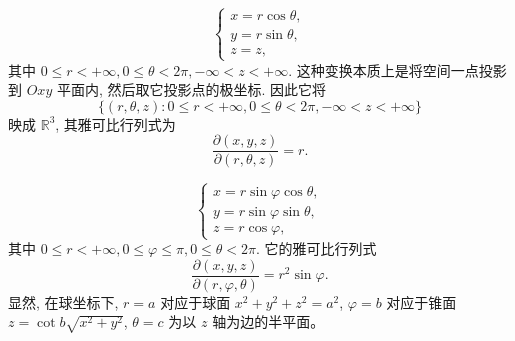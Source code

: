 \documentclass[12pt,fontset=fandol]{ctexart}
\begin{document}
\noindent{}
\[
  \begin{cases}
    x=r\cos\theta,\\
    y=r\sin\theta,\\
    z=z,
  \end{cases}
\]
其中 $0\leqslant r<+\infty,0\leqslant\theta<2\pi,-\infty<z<+\infty$. 这种变换本质上是将空间一点投影到 $Oxy$ 平面内, 然后取它投影点的极坐标. 因此它将
\[
  \{(r,\theta,z):0\leqslant r<+\infty,0\leqslant\theta<2\pi,-\infty<z<+\infty\}
\]
映成 $\mathbb R^3$, 其雅可比行列式为
\[
  \frac{\partial(x,y,z)}{\partial(r,\theta,z)}=r.
\]

\noindent{}
\[
  \begin{cases}
    x=r\sin\varphi\cos\theta,\\
    y=r\sin\varphi\sin\theta,\\
    z=r\cos\varphi,
  \end{cases}
\]
其中 $0\leqslant r<+\infty,0\leqslant\varphi\leqslant\pi,0\leqslant\theta<2\pi$. 它的雅可比行列式
\[
  \frac{\partial(x,y,z)}{\partial(r,\varphi,\theta)}=r^2\sin\varphi.
\]
显然, 在球坐标下, $r=a$ 对应于球面 $x^2+y^2+z^2=a^2$, $\varphi=b$ 对应于锥面 $z=\cot b\sqrt{x^2+y^2}$, $\theta=c$ 为以 $z$ 轴为边的半平面。
\end{document}
